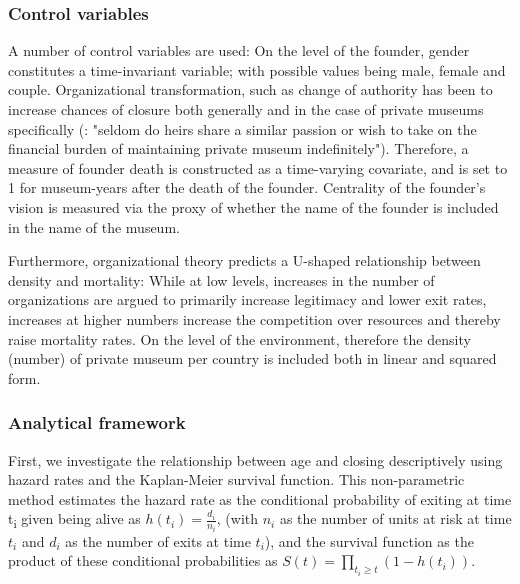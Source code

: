 \documentclass[12pt]{article}
\begin{document}
\subsubsection*{Control variables}


\bigbreak
\noindent
A number of control variables are used: 
On the level of the founder, gender constitutes a time-invariant variable; with possible values being male, female and couple.
Organizational transformation, such as change of authority has been to increase chances of closure both generally \parencite{Carroll_Khessina_2019_demography} and in the case of private museums specifically (\cite[p.234]{Walker_2019_collector}: "seldom do heirs share a similar passion or wish to take on the financial burden of maintaining private museum indefinitely").
Therefore, a measure of founder death is constructed as a time-varying covariate, and is set to 1 for museum-years after the death of the founder. 
Centrality of the founder's vision is measured via the proxy of whether the name of the founder is included in the name of the museum.


Furthermore, organizational theory \parencite{hannan89_organ} predicts a U-shaped relationship between density and mortality:
While at low levels, increases in the number of organizations are argued to primarily increase legitimacy and lower exit rates, increases at higher numbers increase the competition over resources and thereby raise mortality rates.
On the level of the environment, therefore the density (number) of private museum per country is included both in linear and squared form.








\subsubsection*{Analytical framework}



First, we investigate the relationship between age and closing descriptively using hazard rates and the Kaplan-Meier survival function.
This non-parametric method estimates the hazard rate as the conditional probability of exiting at time t\textsubscript{i} given being alive as \(h(t_i) = \frac{d_i}{n_i}\), (with \(n_i\) as the number of units at risk at time \(t_i\) and \(d_i\) as the number of exits at time \(t_i\)), and the survival function as the product of these conditional probabilities as \(S(t) = \prod_{t_i \geq t} \left(1-h(t_i) \right)\).
\end{document}
